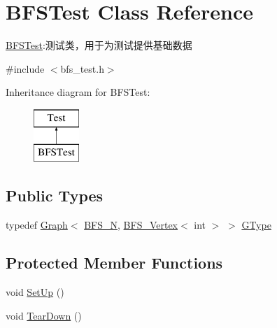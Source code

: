 \hypertarget{class_b_f_s_test}{}\section{B\+F\+S\+Test Class Reference}
\label{class_b_f_s_test}


\hyperlink{class_b_f_s_test}{B\+F\+S\+Test}\+:测试类，用于为测试提供基础数据  




{\ttfamily \#include $<$bfs\+\_\+test.\+h$>$}

Inheritance diagram for B\+F\+S\+Test\+:\begin{figure}[H]
\begin{center}
\leavevmode
\includegraphics[height=2.000000cm]{class_b_f_s_test}
\end{center}
\end{figure}
\subsection*{Public Types}
\begin{DoxyCompactItemize}
\item 
typedef \hyperlink{struct_introduction_to_algorithm_1_1_graph_algorithm_1_1_graph}{Graph}$<$ \hyperlink{bfs__test_8h_a03ae95bcf3deb5cb7f847e18cef466d1}{B\+F\+S\+\_\+\+N}, \hyperlink{struct_introduction_to_algorithm_1_1_graph_algorithm_1_1_b_f_s___vertex}{B\+F\+S\+\_\+\+Vertex}$<$ int $>$ $>$ \hyperlink{class_b_f_s_test_ad38ca5029d5674d467dc71d13f5e5c7c}{G\+Type}
\end{DoxyCompactItemize}
\subsection*{Protected Member Functions}
\begin{DoxyCompactItemize}
\item 
void \hyperlink{class_b_f_s_test_a295164608e7887ea16383eb80e0d2a45}{Set\+Up} ()
\item 
void \hyperlink{class_b_f_s_test_ac160dd8773850140c50cde59c8498764}{Tear\+Down} ()
\end{DoxyCompactItemize}
